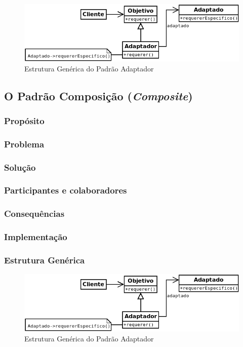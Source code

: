 \begin{figure}[h]
\begin{center}
\includegraphics[scale=0.6]{adaptador.png}
\caption{Estrutura Genérica do Padrão Adaptador}\label{fig:adaptador}
\end{center}
\end{figure}


\subsection{O Padrão Composição (\textit{Composite})}
\subsubsection{Propósito}
\subsubsection{Problema}
\subsubsection{Solução}
\subsubsection{Participantes e colaboradores}
\subsubsection{Consequências}
\subsubsection{Implementação}
\subsubsection{Estrutura Genérica}

\begin{figure}[h]
\begin{center}
\includegraphics[scale=0.6]{adaptador.png}
\caption{Estrutura Genérica do Padrão Adaptador}\label{fig:adaptador}
\end{center}
\end{figure}

